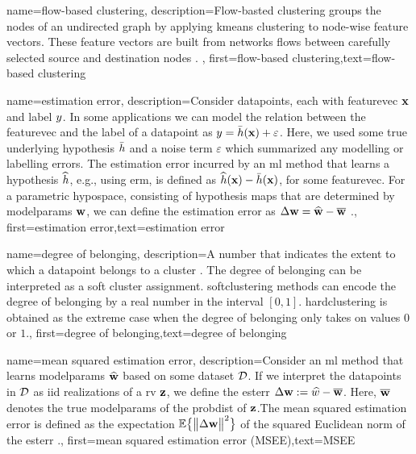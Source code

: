 {name={flow-based clustering},
	description={Flow-basted clustering groups the nodes 
		of an undirected graph by applying \gls{kmeans} clustering to node-wise feature 
		vectors. These \gls{feature} vectors are built from networks flows between 
		carefully selected source and destination nodes \cite{FlowSpecClustering2021}. }, 
	first={flow-based clustering},text={flow-based clustering} 
}



{name={estimation error},
	description={Consider \gls{datapoint}s, each with \gls{featurevec} ${\bf x}$ and \gls{label} 
		$y$. In some applications we can model the relation between the \gls{featurevec} and the \gls{label}
		of a \gls{datapoint} as $y = \bar{h}({\bf x}) + \varepsilon$. Here, we 
		used some true underlying \gls{hypothesis} $\bar{h}$ and a noise term $\varepsilon$ 
		which summarized any modelling or labelling errors. The estimation error incurred by an \gls{ml} 
		method that learns a \gls{hypothesis} $\widehat{h}$, e.g., using \gls{erm}, is defined as 
		$\widehat{h}({\bf x}) - \bar{h}({\bf x})$, for some \gls{featurevec}. 
		For a parametric \gls{hypospace}, consisting of \gls{hypothesis} maps that are determined by 
		\gls{modelparams} ${\bf w}$, we can define the estimation error as $\Delta {\bf w} = \widehat{{\bf w}} - \overline{{\bf w}}$ \cite{kay,hastie01statisticallearning}.},
	first={estimation error},text={estimation error} 
}


{name={degree of belonging},
	description={A number that indicates the extent to which a \gls{datapoint} 
		belongs to a \gls{cluster} \cite[Ch. 8]{MLBasics}. The degree of belonging can be 
		interpreted as a soft \gls{cluster} assignment. \Gls{softclustering} methods can 
		encode the degree of belonging by a real number in the interval $[0,1]$. 
		\Gls{hardclustering} is obtained as the extreme case when the degree of belonging 
		only takes on values $0$ or $1$.}, first={degree of belonging},text={degree of belonging} 
}

{name={mean squared estimation error},
	description={Consider an \gls{ml} method that 
		learns \gls{modelparams} $\widehat{{\bf w}}$ based on some \gls{dataset} $\mathcal{D}$. 
		If we interpret the \gls{datapoint}s in $\mathcal{D}$ as \gls{iid} \gls{realization}s of a \gls{rv} ${\bf z}$, 
		we define the \gls{esterr} $\Delta {\bf w} := \widehat{w} - \overline{{\bf w}}$. 
		Here, $\overline{{\bf w}}$ denotes the true \gls{modelparams} of the \gls{probdist} 
		of ${\bf z}$.The mean squared estimation error is 
		defined as the \gls{expectation} $\mathbb{E} \big\{ \big\| \Delta {\bf w} \big\|^{2} \big\}$ of the 
		squared Euclidean norm of the \gls{esterr} \cite{LC,kay}.},
	first={mean squared estimation error (MSEE)},text={MSEE} 
}

